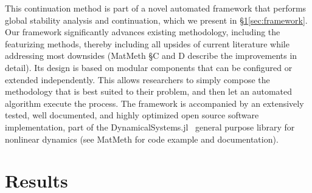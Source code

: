 \documentclass[9pt,twocolumn,twoside,lineno]{pnas-new}
\begin{document}
This continuation method is part of a novel automated framework that performs global stability analysis and continuation, which we present in \S\ref{sec:results}\ref{sec:framework}. Our framework significantly advances existing methodology, including the featurizing methods, thereby including all upsides of current literature while addressing most downsides (MatMeth \S C and D describe the improvements in detail). Its design is based on modular components that can be configured or extended independently. This allows researchers to simply compose the methodology that is best suited to their problem, and then let an automated algorithm execute the process. The framework is accompanied by an extensively tested, well documented, and highly optimized open source software implementation, part of the DynamicalSystems.jl~\cite{DynamicalSystems.jl} general purpose library for nonlinear dynamics (see MatMeth for code example and documentation). 

\section{Results}
\label{sec:results}
\end{document}
